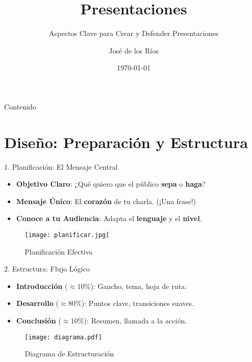 \documentclass{beamer}
\title[Presentaciones]{Presentaciones}
\subtitle{Aspectos Clave para Crear y Defender Presentaciones}
\author{José de los Ríos}
\institute{Universidad de Granada}
\date{\today}
\begin{document}
\begin{frame}
    \titlepage
\end{frame}

\begin{frame}{Contenido}
    \tableofcontents
\end{frame}


\section{Diseño: Preparación y Estructura}

\begin{frame}{1. Planificación: El Mensaje Central}
    \begin{itemize}
        \item \textbf{Objetivo Claro}: ¿Qué quiero que el público \textbf{sepa} o \textbf{haga}?
        \item \textbf{Mensaje Único}: El \textbf{corazón} de tu charla. (¡Una frase!)
        \item \textbf{Conoce a tu Audiencia}: Adapta el \textbf{lenguaje} y el \textbf{nivel}.
    \end{itemize}
    
    \vspace{0.5cm}
    \begin{figure}
        \centering
        \texttt{[image: planificar.jpg]} 
        \caption{Planificación Efectiva}
    \end{figure}
\end{frame}

\begin{frame}{2. Estructura: Flujo Lógico}
    \begin{itemize}
        \item \textbf{Introducción} ($\approx 10\%$): Gancho, tema, hoja de ruta.
        \item \textbf{Desarrollo} ($\approx 80\%$): Puntos clave, transiciones suaves.
        \item \textbf{Conclusión} ($\approx 10\%$): Resumen, llamada a la acción.
    \end{itemize}
    
    \vspace{0.5cm}
    \begin{figure}
        \centering
        \texttt{[image: diagrama.pdf]}
        \caption{Diagrama de Estructuración}
    \end{figure}
\end{frame}
\end{document}
